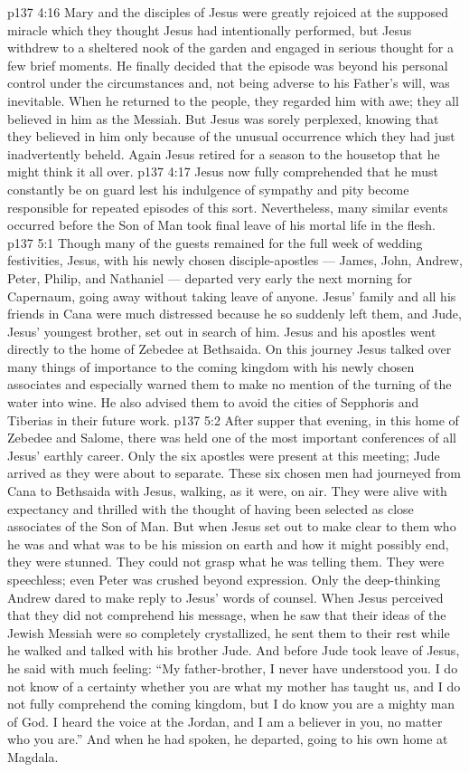 \vs p137 4:16 Mary and the disciples of Jesus were greatly rejoiced at the supposed miracle which they thought Jesus had intentionally performed, but Jesus withdrew to a sheltered nook of the garden and engaged in serious thought for a few brief moments. He finally decided that the episode was beyond his personal control under the circumstances and, not being adverse to his Father’s will, was inevitable. When he returned to the people, they regarded him with awe; they all believed in him as the Messiah. But Jesus was sorely perplexed, knowing that they believed in him only because of the unusual occurrence which they had just inadvertently beheld. Again Jesus retired for a season to the housetop that he might think it all over.
\vs p137 4:17 Jesus now fully comprehended that he must constantly be on guard lest his indulgence of sympathy and pity become responsible for repeated episodes of this sort. Nevertheless, many similar events occurred before the Son of Man took final leave of his mortal life in the flesh.
\vs p137 5:1 Though many of the guests remained for the full week of wedding festivities, Jesus, with his newly chosen disciple\hyp{}apostles --- James, John, Andrew, Peter, Philip, and Nathaniel --- departed very early the next morning for Capernaum, going away without taking leave of anyone. Jesus’ family and all his friends in Cana were much distressed because he so suddenly left them, and Jude, Jesus’ youngest brother, set out in search of him. Jesus and his apostles went directly to the home of Zebedee at Bethsaida. On this journey Jesus talked over many things of importance to the coming kingdom with his newly chosen associates and especially warned them to make no mention of the turning of the water into wine. He also advised them to avoid the cities of Sepphoris and Tiberias in their future work.
\vs p137 5:2 After supper that evening, in this home of Zebedee and Salome, there was held one of the most important conferences of all Jesus’ earthly career. Only the six apostles were present at this meeting; Jude arrived as they were about to separate. These six chosen men had journeyed from Cana to Bethsaida with Jesus, walking, as it were, on air. They were alive with expectancy and thrilled with the thought of having been selected as close associates of the Son of Man. But when Jesus set out to make clear to them who he was and what was to be his mission on earth and how it might possibly end, they were stunned. They could not grasp what he was telling them. They were speechless; even Peter was crushed beyond expression. Only the deep\hyp{}thinking Andrew dared to make reply to Jesus’ words of counsel. When Jesus perceived that they did not comprehend his message, when he saw that their ideas of the Jewish Messiah were so completely crystallized, he sent them to their rest while he walked and talked with his brother Jude. And before Jude took leave of Jesus, he said with much feeling: “My father\hyp{}brother, I never have understood you. I do not know of a certainty whether you are what my mother has taught us, and I do not fully comprehend the coming kingdom, but I do know you are a mighty man of God. I heard the voice at the Jordan, and I am a believer in you, no matter who you are.” And when he had spoken, he departed, going to his own home at Magdala.
